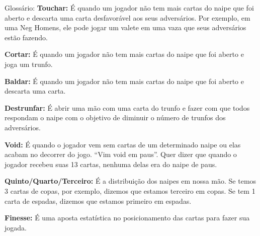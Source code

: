 \begin{subsecao}{Glossário:}
\textbf{Touchar:} É quando um jogador não tem mais cartas do naipe que foi aberto
e descarta uma carta desfavorável aos seus adversários. Por exemplo, em uma Neg
Homens, ele pode jogar um valete em uma vaza que seus adversários estão fazendo.

\textbf{Cortar:}  É quando um jogador não tem mais cartas do naipe que foi aberto
e joga um trunfo.

\textbf{Baldar:} É quando um jogador não tem mais cartas do naipe que foi aberto
e descarta uma carta.

\textbf{Destrunfar:} É abrir uma mão com uma carta do trunfo e fazer com que
todos respondam o naipe com o objetivo de diminuir o número de trunfos dos
adversários.

\textbf{Void:} É quando o jogador vem sem cartas de um determinado naipe ou
elas acabam no decorrer do jogo. “Vim void em paus”. Quer dizer que quando
o jogador recebeu suas 13 cartas, nenhuma delas era do naipe de paus.

\textbf{Quinto/Quarto/Terceiro:} É a distribuição dos naipes em nossa mão.
Se temos 3 cartas de copas, por exemplo, dizemos que estamos terceiro em
copas. Se tem 1 carta de espadas, dizemos que estamos primeiro em espadas.

\textbf{Finesse:} É uma aposta estatística no posicionamento das cartas para
fazer sua jogada.

\end{subsecao}
